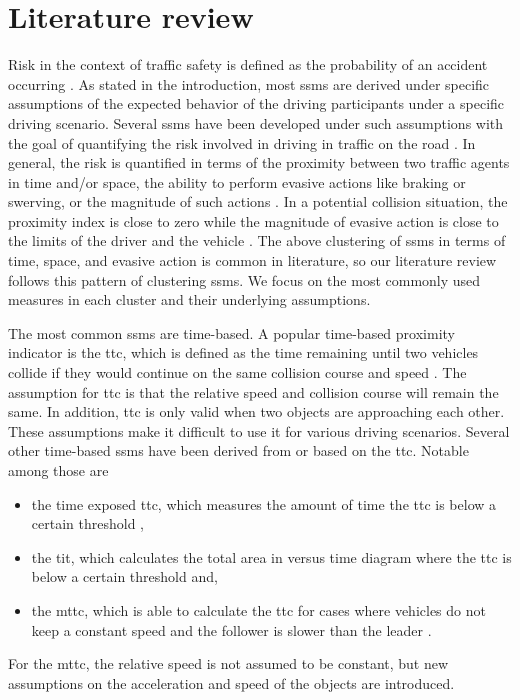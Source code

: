 \section{Literature review}
\label{sec:literature review}

Risk in the context of traffic safety is defined as the probability of an accident occurring \autocite{hakkert2002uses}.
\cstartb As stated in the introduction, most \acp{ssm} are derived under specific assumptions of the expected behavior of the  driving participants under a specific  driving scenario. \cendb
Several \acp{ssm} have been developed \cstartb under such assumptions \cendb with the goal of quantifying the risk involved in driving in traffic on the road \autocite{minderhoud2001extended, ozbay2008derivation, cunto2009simulated, laureshyn2010evaluation}.
In general, the risk is quantified in terms of the proximity between two traffic agents in time and/or space, the ability to perform evasive actions like braking or swerving, or the magnitude of such actions \autocite{shi2018key,zheng2020modeling}. 
In a potential collision situation, the proximity index is close to zero while the magnitude of evasive action is close to the limits of the driver and the vehicle \autocite{zheng2020modeling}. 
\cstartb The above clustering of \acp{ssm} in terms of time, space, and evasive action is common in literature, so our literature review follows this pattern of clustering \acp{ssm}.
We focus on the most commonly used measures in each cluster and their underlying assumptions. \cendb

The most common \acp{ssm} are time-based. 
A popular time-based proximity indicator is the \ac{ttc}, which is defined as the time remaining until two vehicles collide if they would continue on the same collision course and speed \autocite{hayward1972near}.
\cstartb The assumption for \ac{ttc} is that the relative speed and collision course will remain the same. 
In addition, \ac{ttc} is only valid  when two objects are approaching each other. 
These assumptions make it difficult to use it  for various driving scenarios. \cendb
Several other time-based \acp{ssm} have been derived from or based on the \ac{ttc}. 
Notable among those are 
\begin{itemize}
    \item the time exposed \ac{ttc}, which measures the amount of time the \ac{ttc} is below a certain threshold \autocite{minderhoud2001extended}, 
    \item the \ac{tit}, which calculates the total area in  versus time diagram where the \ac{ttc} is below a certain threshold  \autocite{minderhoud2001extended} and,
    \item the \ac{mttc}, which is able to calculate the \ac{ttc} for cases where vehicles do not keep a constant speed and the follower is slower than the leader \autocite{ozbay2008derivation}.
\end{itemize}
\cstartb For the \ac{mttc}, the relative speed is not assumed to be constant, but new assumptions on the  acceleration and speed of the objects are introduced. \cendb 

